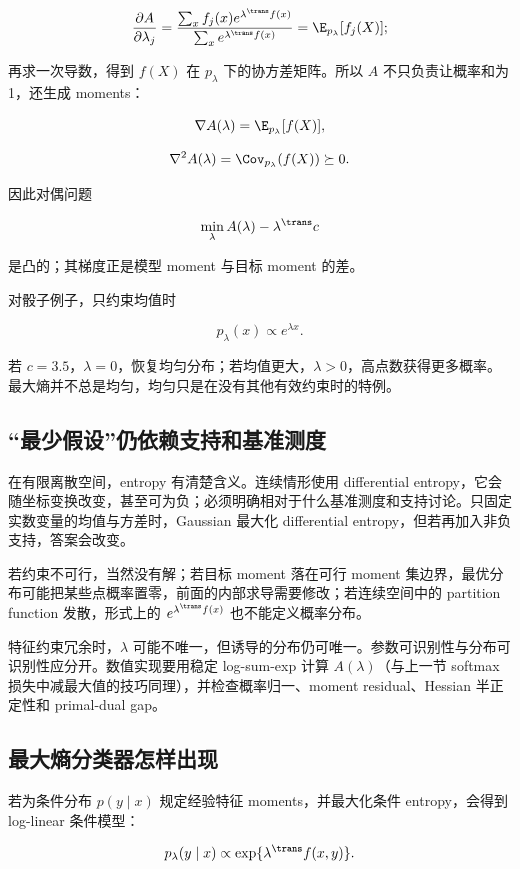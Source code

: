 \[
\frac{\partial A}{\partial\lambda_j}
=\frac{\sum_xf_j(x)e^{\lambda^{\trans} f(x)}}{\sum_xe^{\lambda^{\trans} f(x)}}
=\E_{p_\lambda}[f_j(X)];
\]

再求一次导数，得到 \(f(X)\) 在 \(p_\lambda\) 下的协方差矩阵。所以 \(A\) 不只负责让概率和为 1，还生成 moments：

\[
\nabla A(\lambda)
=\E_{p_\lambda}[f(X)],
\]

\[
\nabla^2A(\lambda)
=\Cov_{p_\lambda}(f(X))
\succeq0.
\]

因此对偶问题

\[
\min_\lambda A(\lambda)-\lambda^{\trans} c
\]

是凸的；其梯度正是模型 moment 与目标 moment 的差。

对骰子例子，只约束均值时

\[
p_\lambda(x)\propto e^{\lambda x}.
\]

若 \(c=3.5\)，\(\lambda=0\)，恢复均匀分布；若均值更大，\(\lambda>0\)，高点数获得更多概率。最大熵并不总是均匀，均匀只是在没有其他有效约束时的特例。

\subsection{``最少假设''仍依赖支持和基准测度}

在有限离散空间，entropy 有清楚含义。连续情形使用 differential entropy，它会随坐标变换改变，甚至可为负；必须明确相对于什么基准测度和支持讨论。只固定实数变量的均值与方差时，Gaussian 最大化 differential entropy，但若再加入非负支持，答案会改变。

若约束不可行，当然没有解；若目标 moment 落在可行 moment 集边界，最优分布可能把某些点概率置零，前面的内部求导需要修改；若连续空间中的 partition function 发散，形式上的 \(e^{\lambda^{\trans} f(x)}\) 也不能定义概率分布。

特征约束冗余时，\(\lambda\) 可能不唯一，但诱导的分布仍可唯一。参数可识别性与分布可识别性应分开。数值实现要用稳定 log-sum-exp 计算 \(A(\lambda)\)（与上一节 softmax 损失中减最大值的技巧同理），并检查概率归一、moment residual、Hessian 半正定性和 primal-dual gap。

\subsection{最大熵分类器怎样出现}

若为条件分布 \(p(y\mid x)\) 规定经验特征 moments，并最大化条件 entropy，会得到 log-linear 条件模型：

\[
p_\lambda(y\mid x)
\propto\exp\{\lambda^{\trans} f(x,y)\}.
\]

